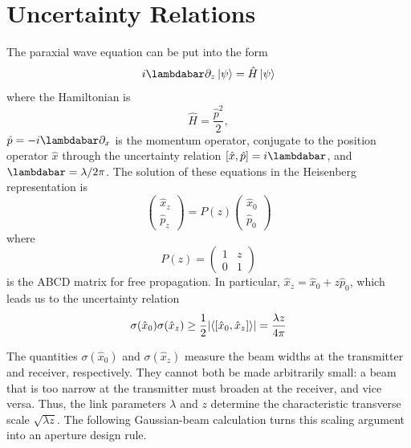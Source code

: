 \documentclass[a4paper,10pt]{article}
\begin{document}
\section{Uncertainty Relations}

The paraxial wave equation can be put into the form
\begin{equation}
    i \lambdabar \partial_z \ket{\psi} = \hat{H} \ket{\psi}
\end{equation}
where the Hamiltonian is
\begin{equation}
    \hat{H} = \frac{\hat{p}^2}{2},
\end{equation}
$\hat{p} = -i \lambdabar \partial_x$ is the momentum operator, conjugate to the position operator $\hat{x}$ through the uncertainty relation $\comm{\hat{x}}{\hat{p}} = i \lambdabar$, and $\lambdabar = \lambda / 2\pi$. The solution of these equations in the Heisenberg representation is
\begin{equation}
    \begin{pmatrix}
        \hat{x}_z \\
        \hat{p}_z
    \end{pmatrix} = P(z) \begin{pmatrix}
        \hat{x}_0 \\
        \hat{p}_0
    \end{pmatrix}
\end{equation}
where
\begin{equation}
    P(z) = \begin{pmatrix} 1 & z \\ 0 & 1 \end{pmatrix}
\end{equation}
is the ABCD matrix for free propagation. In particular, $\hat{x}_z = \hat{x}_0 + z\hat{p}_0$, which leads us to the uncertainty relation
\begin{equation}
    \label{eq:base_uncertainty}
    \sigma(\hat{x}_0)\sigma(\hat{x}_z) \ge \frac{1}{2}\abs{\expval{\comm{\hat{x}_0}{\hat{x}_z}}} = \frac{\lambda z}{4\pi}
\end{equation}

The quantities $\sigma(\hat{x}_0)$ and $\sigma(\hat{x}_z)$ measure the beam widths at the transmitter and receiver, respectively. They cannot both be made arbitrarily small: a beam that is too narrow at the transmitter must broaden at the receiver, and vice versa. Thus, the link parameters $\lambda$ and $z$ determine the characteristic transverse scale $\sqrt{\lambda z}$. The following Gaussian-beam calculation turns this scaling argument into an aperture design rule.
\end{document}
